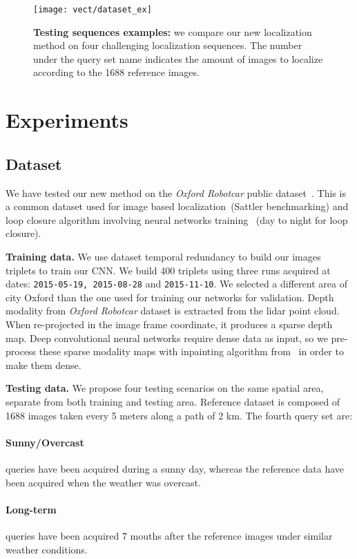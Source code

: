 \begin{figure}
	\center
	\texttt{[image: vect/dataset\_ex]}
	\caption{\label{fig:dataset} \textbf{Testing sequences examples:} we compare our new localization method on four challenging localization sequences. The number under the query set name indicates the amount of images to localize according to the 1688 reference images.}
\end{figure}

\section{Experiments}
\label{sec:experiments}

\subsection{Dataset}
\label{subsec:dataset}
	We have tested our new method on the \textit{Oxford Robotcar} public dataset~\cite{Maddern2016}. This is a common dataset used for image based localization~\cite{}(Sattler benchmarking) and loop closure algorithm involving neural networks training~\cite{} (day to night for loop closure).
		
\noindent\textbf{Training data.}
	We use dataset temporal redundancy to build our images triplets to train our CNN. We build 400 triplets using three runs acquired at dates: \texttt{2015-05-19, 2015-08-28} and \texttt{2015-11-10}. We selected a different area of city Oxford than the one used for training our networks for validation.
	Depth modality from \textit{Oxford Robotcar} dataset is extracted from the lidar point cloud. When re-projected in the image frame coordinate, it produces a sparse depth map. Deep convolutional neural networks require dense data as input, so we pre-process these sparse modality maps with inpainting algorithm from~\cite{Bevilacqua2017} in order to make them dense.

\noindent\textbf{Testing data.} We propose four testing scenarios on the same spatial area, separate from both training and testing area. Reference dataset is composed of 1688 images taken every 5 meters along a path of 2 km. The fourth query set are:
	\paragraph{Sunny/Overcast} queries have been acquired during a sunny day, whereas the reference data have been acquired when the weather was overcast.
	\paragraph{Long-term} queries have been acquired 7 mouths after the reference images under similar weather conditions.
